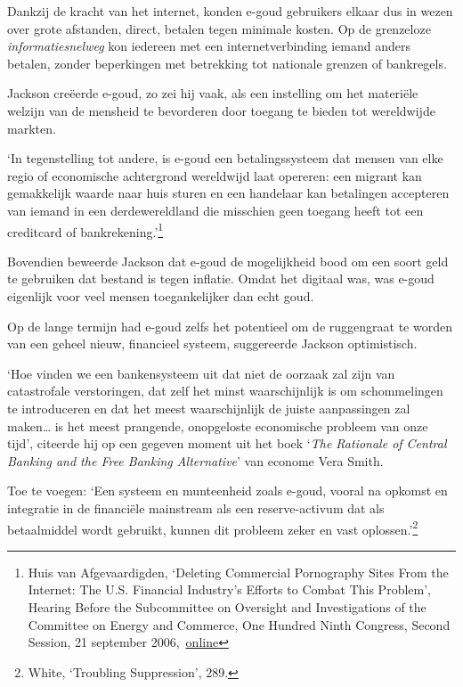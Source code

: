 \documentclass[
  a5paper,
  smalldemyvopaper,11pt,twoside,onecolumn,openright,extrafontsizes]{memoir}
\begin{document}
Dankzij de kracht van het internet, konden e-goud gebruikers elkaar dus
in wezen over grote afstanden, direct, betalen tegen minimale kosten. Op
de grenzeloze \emph{informatiesnelweg} kon iedereen met een
internetverbinding iemand anders betalen, zonder beperkingen met
betrekking tot nationale grenzen of bankregels.

Jackson creëerde e-goud, zo zei hij vaak, als een instelling om het
materiële welzijn van de mensheid te bevorderen door toegang te bieden
tot wereldwijde markten.

`In tegenstelling tot andere, is e-goud een betalingssysteem dat mensen
van elke regio of economische achtergrond wereldwijd laat opereren: een
migrant kan gemakkelijk waarde naar huis sturen en een handelaar kan
betalingen accepteren van iemand in een derdewereldland die misschien
geen toegang heeft tot een creditcard of bankrekening.'\footnote{Huis
  van Afgevaardigden, `Deleting Commercial Pornography Sites From the
  Internet: The U.S. Financial Industry's Efforts to Combat This
  Problem', Hearing Before the Subcommittee on Oversight and
  Investigations of the Committee on Energy and Commerce, One Hundred
  Ninth Congress, Second Session, 21 september
  2006,~\href{https://www.govinfo.gov/content/pkg/CHRG-109hhrg31467/html/CHRG-109hhrg31467.htm}{online}}

Bovendien beweerde Jackson dat e-goud de mogelijkheid bood om een soort
geld te gebruiken dat bestand is tegen inflatie. Omdat het digitaal was,
was e-goud eigenlijk voor veel mensen toegankelijker dan echt goud.

Op de lange termijn had e-goud zelfs het potentieel om de ruggengraat te
worden van een geheel nieuw, financieel systeem, suggereerde Jackson
optimistisch.

`Hoe vinden we een bankensysteem uit dat niet de oorzaak zal zijn van
catastrofale verstoringen, dat zelf het minst waarschijnlijk is om
schommelingen te introduceren en dat het meest waarschijnlijk de juiste
aanpassingen zal maken\ldots{} is het meest prangende, onopgeloste
economische probleem van onze tijd', citeerde hij op een gegeven moment
uit het boek `\emph{The Rationale of Central Banking and the Free
Banking Alternative}' van econome Vera Smith.

Toe te voegen: `Een systeem en munteenheid zoals e-goud, vooral na
opkomst en integratie in de financiële mainstream als een
reserve-activum dat als betaalmiddel wordt gebruikt, kunnen dit probleem
zeker en vast oplossen.'\footnote{\hspace{0pt}White, `Troubling
  Suppression', 289.}
\end{document}
